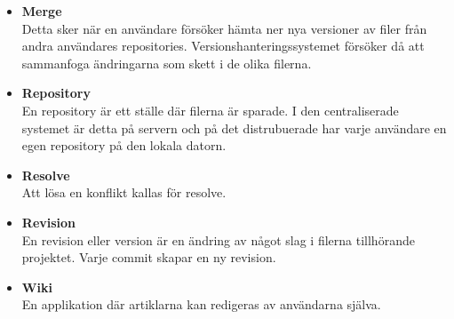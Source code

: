 \begin{itemize}
	\item \textbf{Merge}
	\\Detta sker när en användare försöker hämta ner nya versioner av filer från andra användares repositories. Versionshanteringssystemet försöker då att sammanfoga ändringarna som skett i de olika filerna.
			
	\item \textbf{Repository}
	\\En repository är ett ställe där filerna är sparade. I den centraliserade systemet är detta på servern och på det distrubuerade har varje användare en egen repository på den lokala datorn.

	\item \textbf{Resolve}
	\\Att lösa en konflikt kallas för resolve.
	
	\item \textbf{Revision}
	\\En revision eller version är en ändring av något slag i filerna tillhörande projektet. Varje commit skapar en ny revision.
	
	\item \textbf{Wiki} \\
	En applikation där artiklarna kan redigeras av användarna själva.
\end{itemize}

